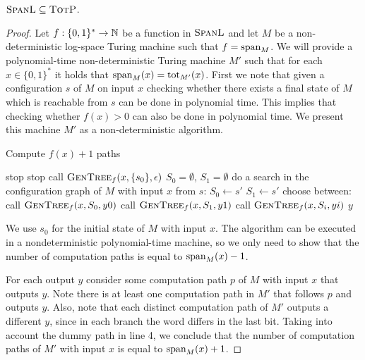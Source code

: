 \begin{theo}
	$\spanl \subseteq \totp$.
\end{theo}
\begin{proof}
	Let $f:\{0,1\}^*\to\N$ be a function in $\spanl$ and let $M$ be a non-deterministic log-space Turing machine such that $f = \sp_M$. We will provide a polynomial-time non-deterministic Turing machine $M'$ such that for each $x\in\{0,1\}^*$ it holds that $\sp_M(x) = \tot_{M'}(x)$. First we note that given a configuration $s$ of $M$ on input $x$ checking whether there exists a final state of $M$ which is reachable from $s$ can be done in polynomial time. This implies that checking whether $f(x) > 0$ can also be done in polynomial time. We present this machine $M'$ as a non-deterministic algorithm.
	
	\begin{algorithm}	
	\caption{Compute $f(x)+1$ paths}
	\begin{algorithmic}[]
		\Begin
		 stop
		\Else {}
		\State stop
		\State call $\textsc{GenTree}_{f}(x,\{s_0\},\epsilon)$
		\EndIf
		\EndBegin
		\State $S_0 = \emptyset$, $S_1 = \emptyset$
		\State do a search in the configuration graph of $M$ with input $x$ from $s$:
		 $S_0 \gets s'$
		\EndIf
		 $S_1 \gets s'$
		\EndIf
		\EndFor
		 choose between:
		\State call $\textsc{GenTree}_{f}(x,S_0,y0)$
		\State call $\textsc{GenTree}_{f}(x,S_1,y1)$
		\State call $\textsc{GenTree}_{f}(x,S_i,yi)$
		\Return $y$
		\EndIf
		\EndProcedure
	\end{algorithmic}
	\end{algorithm}
	
	We use $s_0$ for the initial state of $M$ with input $x$. The algorithm can be executed in a nondeterministic polynomial-time machine, so we only need to show that the number of computation paths is equal to $\sp_M(x)-1$.
	
	For each output $y$ consider some computation path $p$ of $M$ with input $x$ that outputs $y$. Note there is at least one computation path in $M'$ that follows $p$ and outputs $y$. Also, note that each distinct computation path of $M'$ outputs a different $y$, since in each branch the word differs in the last bit. Taking into account the dummy path in line 4, we conclude that the number of computation paths of $M'$ with input $x$ is equal to $\sp_M(x)+1$. 
	
	
	
\end{proof}

